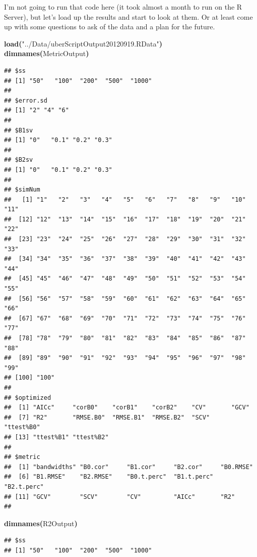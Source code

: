 \documentclass{article}
\makeatletter
\newcommand{\hlfunctioncall}[1]{\textcolor[rgb]{0.501960784313725,0,0.329411764705882}{\textbf{#1}}}%
\newcommand{\hlstring}[1]{\textcolor[rgb]{0.6,0.6,1}{#1}}%
\newcommand{\hlkeyword}[1]{\textcolor[rgb]{0,0,0}{\textbf{#1}}}%
\newcommand{\hlsymbol}[1]{\textcolor[rgb]{0,0,0}{#1}}%
\newcommand{\hlstd}[1]{\textcolor[rgb]{0,0,0}{#1}}%
\newenvironment{kframe}{%
 \def\FrameCommand##1{\hskip\@totalleftmargin \hskip-\fboxsep
 \colorbox{shadecolor}{##1}\hskip-\fboxsep
     \hskip-\linewidth \hskip-\@totalleftmargin \hskip\columnwidth}%
 \MakeFramed {\advance\hsize-\width
   \@totalleftmargin\z@ \linewidth\hsize
   \@setminipage}}%
 {\par\unskip\endMakeFramed}
\newenvironment{knitrout}{}{} %
\makeatother
\begin{document}
I'm not going to run that code here (it took almost a month to run on the R Server), but let's load up the results and start to look at them. Or at least come up with some questions to ask of the data and a plan for the future.
\newpage
\begin{knitrout}
\color{fgcolor}\begin{kframe}
\begin{flushleft}
\ttfamily\noindent
\hlfunctioncall{load}\hlkeyword{(}\hlstring{"{}../Data/uberScriptOutput20120919.RData"{}}\hlkeyword{)}\hspace*{\fill}\\
\hlstd{}\hlfunctioncall{dimnames}\hlkeyword{(}\hlsymbol{MetricOutput}\hlkeyword{)}\mbox{}
\normalfont
\end{flushleft}
\begin{verbatim}
## $ss
## [1] "50"   "100"  "200"  "500"  "1000"
## 
## $error.sd
## [1] "2" "4" "6"
## 
## $B1sv
## [1] "0"   "0.1" "0.2" "0.3"
## 
## $B2sv
## [1] "0"   "0.1" "0.2" "0.3"
## 
## $simNum
##   [1] "1"   "2"   "3"   "4"   "5"   "6"   "7"   "8"   "9"   "10"  "11" 
##  [12] "12"  "13"  "14"  "15"  "16"  "17"  "18"  "19"  "20"  "21"  "22" 
##  [23] "23"  "24"  "25"  "26"  "27"  "28"  "29"  "30"  "31"  "32"  "33" 
##  [34] "34"  "35"  "36"  "37"  "38"  "39"  "40"  "41"  "42"  "43"  "44" 
##  [45] "45"  "46"  "47"  "48"  "49"  "50"  "51"  "52"  "53"  "54"  "55" 
##  [56] "56"  "57"  "58"  "59"  "60"  "61"  "62"  "63"  "64"  "65"  "66" 
##  [67] "67"  "68"  "69"  "70"  "71"  "72"  "73"  "74"  "75"  "76"  "77" 
##  [78] "78"  "79"  "80"  "81"  "82"  "83"  "84"  "85"  "86"  "87"  "88" 
##  [89] "89"  "90"  "91"  "92"  "93"  "94"  "95"  "96"  "97"  "98"  "99" 
## [100] "100"
## 
## $optimized
##  [1] "AICc"     "corB0"    "corB1"    "corB2"    "CV"       "GCV"     
##  [7] "R2"       "RMSE.B0"  "RMSE.B1"  "RMSE.B2"  "SCV"      "ttest%B0"
## [13] "ttest%B1" "ttest%B2"
## 
## $metric
##  [1] "bandwidths" "B0.cor"     "B1.cor"     "B2.cor"     "B0.RMSE"   
##  [6] "B1.RMSE"    "B2.RMSE"    "B0.t.perc"  "B1.t.perc"  "B2.t.perc" 
## [11] "GCV"        "SCV"        "CV"         "AICc"       "R2"        
## 
\end{verbatim}
\begin{flushleft}
\ttfamily\noindent
\hlfunctioncall{dimnames}\hlkeyword{(}\hlsymbol{R2Output}\hlkeyword{)}\mbox{}
\normalfont
\end{flushleft}
\begin{verbatim}
## $ss
## [1] "50"   "100"  "200"  "500"  "1000"

\end{verbatim}
\end{kframe}
\end{knitrout}
\end{document}
